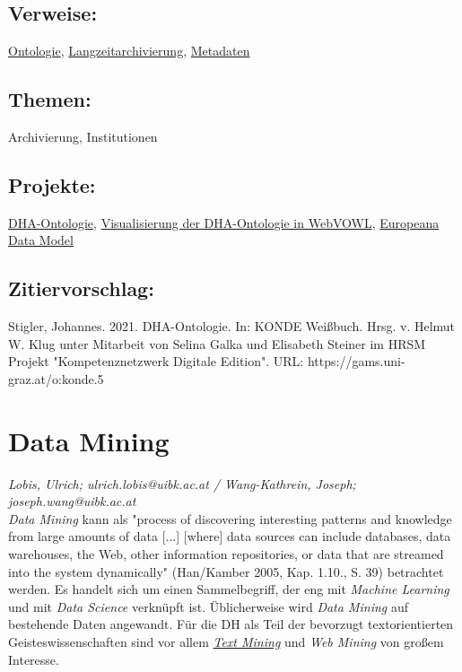 \documentclass{article}
\begin{document}
        \subsection*{Verweise:}\href{https://gams.uni-graz.at/o:konde.151}{Ontologie}, \href{https://gams.uni-graz.at/o:konde.6}{Langzeitarchivierung}, \href{https://gams.uni-graz.at/o:konde.25}{Metadaten}\subsection*{Themen:}Archivierung, Institutionen\subsection*{Projekte:}\href{https://github.com/acdh-oeaw/dha-ontology}{DHA-Ontologie}, \href{http://visualdataweb.de/webvowl/#iri=https://raw.githubusercontent.com/acdh-oeaw/dha-ontology/master/dha-ontology.owl}{Visualisierung der DHA-Ontologie in WebVOWL}, \href{https://pro.europeana.eu/page/edm-documentation}{Europeana Data Model}\subsection*{Zitiervorschlag:}Stigler, Johannes. 2021. DHA-Ontologie. In: KONDE Weißbuch. Hrsg. v. Helmut W. Klug unter Mitarbeit von Selina Galka und Elisabeth Steiner im HRSM Projekt "Kompetenznetzwerk Digitale Edition". URL: https://gams.uni-graz.at/o:konde.5\newpage\section*{Data Mining} \emph{Lobis, Ulrich; ulrich.lobis@uibk.ac.at / Wang-Kathrein, Joseph; joseph.wang@uibk.ac.at}\\
        
    \emph{Data Mining} kann als "process of discovering interesting patterns and knowledge from large amounts of data [...] [where] data sources can include databases, data warehouses, the Web, other information repositories, or data that are streamed into the system dynamically" (Han/Kamber 2005, Kap. 1.10., S. 39) betrachtet werden. Es handelt sich um einen Sammelbegriff, der eng mit \emph{Machine Learning} und mit \emph{Data Science} verknüpft ist. Üblicherweise wird \emph{Data Mining} auf bestehende Daten angewandt. Für die DH als Teil der bevorzugt textorientierten Geisteswissenschaften sind vor allem \emph{\href{http://gams.uni-graz.at/o:konde.194}{Text Mining}} und \emph{Web Mining} von großem Interesse.\\
            
\end{document}
